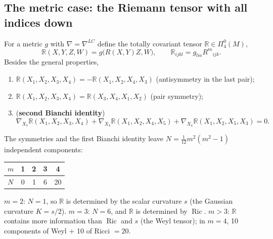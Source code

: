 \documentclass[11pt,a4paper]{article}
\numberwithin{equation}{section}
\theoremstyle{definition}
\theoremstyle{plain}
\newcommand{\Ric}{\operatorname{Ric}}
\newcommand{\TF}[2]{\Pi^{#1}_{#2}}                  %
\begin{document}
\subsection{The metric case: the Riemann tensor with all indices down}
\begin{formal}
For a metric $g$ with $\nabla=\nabla^{LC}$ define the totally covariant tensor $\mathbb R\in\TF{0}{4}(M)$,
\[
\mathbb R(X,Y,Z,W)=g\big(R(X,Y)Z,W\big),\qquad \mathbb R_{ijkl}=g_{lm}R^m{}_{ijk}.
\]
Besides the general properties,
\begin{enumerate}[nosep,label=(\alph*)]
\item $\mathbb R(X_1,X_2,X_3,X_4)=-\mathbb R(X_1,X_2,X_4,X_3)$ (antisymmetry in the last pair);
\item $\mathbb R(X_1,X_2,X_3,X_4)=\mathbb R(X_3,X_4,X_1,X_2)$ (pair symmetry);
\item (\textbf{second Bianchi identity}) \[\nabla_{X_5}\mathbb R(X_1,X_2,X_3,X_4)+\nabla_{X_3}\mathbb R(X_1,X_2,X_4,X_5)+\nabla_{X_4}\mathbb R(X_1,X_2,X_5,X_3)=0.\]
\end{enumerate}
\end{formal}

\begin{formal}
The symmetries and the first Bianchi identity leave $N=\frac1{12}m^2(m^2-1)$ independent components:
\begin{center}
\begin{tabular}{@{}lcccc@{}}
\toprule
$m$ & 1 & 2 & 3 & 4\\ \midrule
$N$ & 0 & 1 & 6 & 20\\ \bottomrule
\end{tabular}
\end{center}
$m=2$: $N=1$, so $\mathbb R$ is determined by the scalar curvature $s$ (the Gaussian curvature $K=s/2$). $m=3$: $N=6$, and $\mathbb R$ is determined by $\Ric$. $m>3$: $\mathbb R$ contains more information than $\Ric$ and $s$ (the Weyl tensor); in $m=4$, 10 components of Weyl $+$ 10 of Ricci $=20$.
\end{formal}
\end{document}
